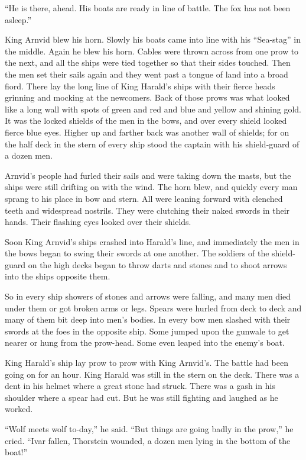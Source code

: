 ``He is there, ahead. His boats are ready in line of battle. The fox has
not been asleep.''

King Arnvid blew his horn. Slowly his boats came into line with his
``Sea-stag'' in the middle. Again he blew his horn. Cables were thrown
across from one prow to the next, and all the ships were tied together
so that their sides touched. Then the men set their sails again and they
went past a tongue of land into a broad fiord. There lay the long line
of King Harald's ships with their fierce heads grinning and mocking at
the newcomers. Back of those prows was what looked like a long wall with
spots of green and red and blue and yellow and shining gold. It was the
locked shields of the men in the bows, and over every shield looked
fierce blue eyes. Higher up and farther back was another wall of
shields; for on the half deck in the stern of every ship stood the
captain with his shield-guard of a dozen men.

Arnvid's people had furled their sails and were taking down the masts,
but the ships were still drifting on with the wind. The horn blew, and
quickly every man sprang to his place in bow and stern. All were leaning
forward with clenched teeth and widespread nostrils. They were clutching
their naked swords in their hands. Their flashing eyes looked over their
shields.

Soon King Arnvid's ships crashed into Harald's line, and immediately the
men in the bows began to swing their swords at one another. The soldiers
of the shield-guard on the high decks began to throw darts and stones
and to shoot arrows into the ships opposite them.

So in every ship showers of stones and arrows were falling, and many men
died under them or got broken arms or legs. Spears were hurled from deck
to deck and many of them bit deep into men's bodies. In every bow men
slashed with their swords at the foes in the opposite ship. Some jumped
upon the gunwale to get nearer or hung from the prow-head. Some even
leaped into the enemy's boat.

King Harald's ship lay prow to prow with King Arnvid's. The battle had
been going on for an hour. King Harald was still in the stern on the
deck. There was a dent in his helmet where a great stone had struck.
There was a gash in his shoulder where a spear had cut. But he was still
fighting and laughed as he worked.

``Wolf meets wolf to-day,'' he said. ``But things are going badly in the
prow,'' he cried. ``Ivar fallen, Thorstein wounded, a dozen men lying in
the bottom of the boat!''

